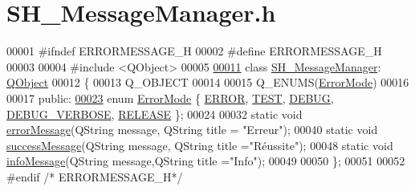 \hypertarget{SH__MessageManager_8h_source}{\section{S\-H\-\_\-\-Message\-Manager.\-h}
}

\begin{DoxyCode}
00001 \textcolor{preprocessor}{#ifndef ERRORMESSAGE\_H}
00002 \textcolor{preprocessor}{}\textcolor{preprocessor}{#define ERRORMESSAGE\_H}
00003 \textcolor{preprocessor}{}
00004 \textcolor{preprocessor}{#include <QObject>}
00005 
\hypertarget{SH__MessageManager_8h_source_l00011}{}\hyperlink{classSH__MessageManager}{00011} \textcolor{keyword}{class }\hyperlink{classSH__MessageManager}{SH\_MessageManager}: \hyperlink{classQObject}{QObject}
00012 \{
00013     Q\_OBJECT
00014 
00015     Q\_ENUMS(\hyperlink{classSH__MessageManager_a13742daa1342475d4fcee295b9dee4ee}{ErrorMode})
00016 
00017 \textcolor{keyword}{public}:
\hypertarget{SH__MessageManager_8h_source_l00023}{}\hyperlink{classSH__MessageManager_a13742daa1342475d4fcee295b9dee4eea20e4a860505461ef78ebb902cac1bbc7}{00023}     \textcolor{keyword}{enum} \hyperlink{classSH__MessageManager_a13742daa1342475d4fcee295b9dee4ee}{ErrorMode} \{ \hyperlink{classSH__MessageManager_a13742daa1342475d4fcee295b9dee4eeaed8e377759e5f203a417dbd267cbc33a}{ERROR}, \hyperlink{classSH__MessageManager_a13742daa1342475d4fcee295b9dee4eea20e4a860505461ef78ebb902cac1bbc7}{TEST}, \hyperlink{classSH__MessageManager_a13742daa1342475d4fcee295b9dee4eeac1f651f46ed4faeccbb6ce75f31c6123}{DEBUG}, \hyperlink{classSH__MessageManager_a13742daa1342475d4fcee295b9dee4eea10b19d57d9a8572101d39b51cdca79d0}{DEBUG\_VERBOSE}, 
      \hyperlink{classSH__MessageManager_a13742daa1342475d4fcee295b9dee4eea81df11b9abe47d3c95d300a3ff71227e}{RELEASE} \};
00024 
00032     \textcolor{keyword}{static} \textcolor{keywordtype}{void} \hyperlink{classSH__MessageManager_acb5615cc90f198f4768da800a5d32362}{errorMessage}(QString message, QString title = \textcolor{stringliteral}{"Erreur"});
00040     \textcolor{keyword}{static} \textcolor{keywordtype}{void} \hyperlink{classSH__MessageManager_a7d69b7cb8082f97cd3b6c8d446058959}{successMessage}(QString message, QString title =\textcolor{stringliteral}{"Réussite"});
00048     \textcolor{keyword}{static} \textcolor{keywordtype}{void} \hyperlink{classSH__MessageManager_a5d9271c143593ccfddce6162b84f8207}{infoMessage}(QString message,QString title =\textcolor{stringliteral}{"Info"});
00049 
00050 \};
00051 
00052 \textcolor{preprocessor}{#endif }\textcolor{comment}{/* ERRORMESSAGE\_H*/}\textcolor{preprocessor}{}
\end{DoxyCode}
